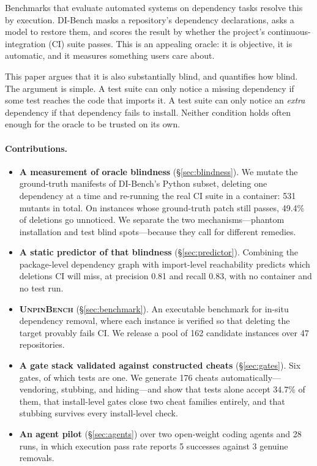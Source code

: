\documentclass[11pt]{article}
\newcommand{\bench}{\textsc{UnpinBench}}
\newcommand{\dibench}{DI-Bench}
\begin{document}
Benchmarks that evaluate automated systems on dependency tasks resolve this by execution.
\dibench{} \citep{dibench2025} masks a repository's dependency declarations, asks a model to restore them, and scores the result by whether the project's continuous-integration (CI) suite passes.
This is an appealing oracle: it is objective, it is automatic, and it measures something users care about.

This paper argues that it is also substantially blind, and quantifies how blind.
The argument is simple.
A test suite can only notice a missing dependency if some test reaches the code that imports it.
A test suite can only notice an \emph{extra} dependency if that dependency fails to install.
Neither condition holds often enough for the oracle to be trusted on its own.

\paragraph{Contributions.}
\begin{itemize}
\item \textbf{A measurement of oracle blindness} (\S\ref{sec:blindness}).
We mutate the ground-truth manifests of \dibench's Python subset, deleting one dependency at a time and re-running the real CI suite in a container: 531 mutants in total.
On instances whose ground-truth patch still passes, 49.4\% of deletions go unnoticed.
We separate the two mechanisms---phantom installation and test blind spots---because they call for different remedies.

\item \textbf{A static predictor of that blindness} (\S\ref{sec:predictor}).
Combining the package-level dependency graph with import-level reachability predicts which deletions CI will miss, at precision 0.81 and recall 0.83, with no container and no test run.

\item \textbf{\bench} (\S\ref{sec:benchmark}).
An executable benchmark for in-situ dependency removal, where each instance is verified so that deleting the target provably fails CI.
We release a pool of 162 candidate instances over 47 repositories.

\item \textbf{A gate stack validated against constructed cheats} (\S\ref{sec:gates}).
Six gates, of which tests are one.
We generate 176 cheats automatically---vendoring, stubbing, and hiding---and show that tests alone accept 34.7\% of them, that install-level gates close two cheat families entirely, and that stubbing survives every install-level check.

\item \textbf{An agent pilot} (\S\ref{sec:agents}) over two open-weight coding agents and 28 runs, in which execution pass rate reports 5 successes against 3 genuine removals.
\end{itemize}
\end{document}
